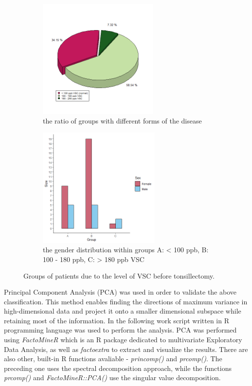 \documentclass[12pt,a4paper,notitlepage]{report}
\begin{document}
\begin{figure}[h]
 
\begin{subfigure}{0.5\textwidth}
\includegraphics[width=1\linewidth, height=6cm]{./Figures/Fig_2.1a} 
\caption{the ratio of groups with different forms of the disease}
\label{Fig_2.1a}
\end{subfigure}
\begin{subfigure}{0.5\textwidth}
\includegraphics[width=1.1\linewidth, height=6cm]{./Figures/Fig_2.1b}
\caption{the gender distribution within groups A: < 100 ppb,  B: 100 - 180 ppb, C: > 180 ppb VSC}
\label{Fig_2.1b}
\end{subfigure}
 
\caption{Groups of patients due to the level of VSC before tonsillectomy.}
\label{Fig_2.1}
\end{figure}


Principal Component Analysis (PCA) was used in order to validate the above classification. This method enables finding the directions of maximum variance in high-dimensional data and project it onto a smaller dimensional subspace while retaining most of the information. In the following work script written in R programming language was used to perform the analysis. PCA was performed using \textit{FactoMineR} which is an R package dedicated to multivariate Exploratory Data Analysis, as well as \textit{factoextra} to extract and visualize the results. There are also other, built-in R functions avaliable - \textit{princomp()} and \textit{prcomp()}. The preceding one uses the spectral decomposition approach, while the functions \textit{prcomp()} and  \textit{FactoMineR::PCA()} use the singular value decomposition.
\end{document}
